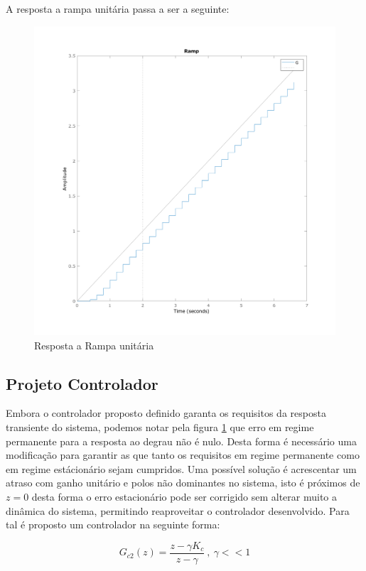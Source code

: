\documentclass[a4paper,11pt]{article}
\begin{document}
A resposta a rampa unitária passa a ser a seguinte:

\begin{figure}[H]
    \centering
    \includegraphics[width=0.8\linewidth]{img/exsim3-ramp-g2-control.png}
    \caption{Resposta a Rampa unitária}
    \label{fig:ex3-step-g2-control}
\end{figure}

\subsection{Projeto Controlador}

Embora o controlador proposto definido garanta os requisitos da resposta transiente do sistema, podemos notar pela figura \ref{fig:ex3-step-g2-control} que erro em regime permanente para a resposta ao degrau não é nulo. Desta forma é necessário uma modificação para garantir as que tanto os requisitos em regime permanente como em regime estácionário sejam cumpridos. Uma possível solução é acrescentar um atraso com ganho unitário e polos não dominantes no sistema, isto é próximos de $z=0$ desta forma o erro estacionário pode ser corrigido sem alterar muito a dinâmica do sistema, permitindo reaproveitar o controlador desenvolvido. Para tal é proposto um controlador na seguinte forma:

\begin{equation}
    G_{c2}(z) = \frac{z - \gamma K_c}{z-\gamma}\ ,\ \gamma << 1
\end{equation}
\end{document}
